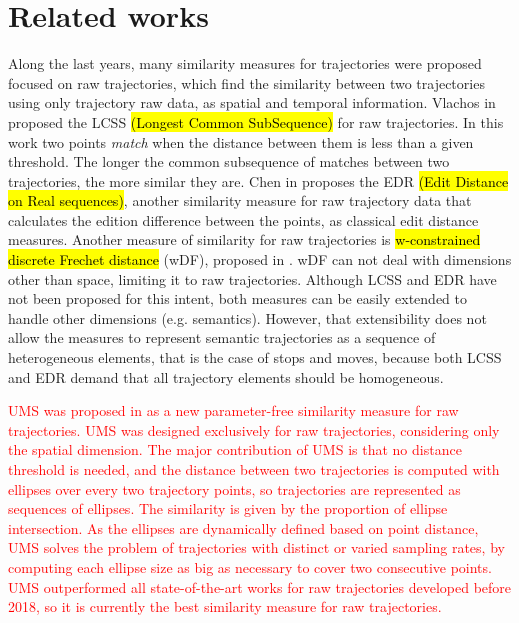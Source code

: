 \documentclass[12pt]{article}
\begin{document}
\section{Related works} \label{sec:related}
Along the last years, many similarity measures for trajectories were proposed focused on raw trajectories, which find the similarity between two trajectories using only trajectory raw data, as spatial and temporal information. Vlachos in \cite{vlachos2002discovering} proposed the LCSS \hl{(Longest Common SubSequence)} for raw trajectories. In this work two points \textit{match} when the distance between them is less than a given threshold. The longer the common subsequence of matches between two trajectories, the more similar they are. Chen in \cite{Chen:2005:RFS:1066157.1066213} proposes the EDR \hl{(Edit Distance on Real sequences)}, another similarity measure for raw trajectory data that calculates the edition difference between the points, as classical edit distance measures. Another measure of similarity for raw trajectories is \hl{w-constrained discrete Frechet distance} (wDF), proposed in \cite{Ding:2008:ESJ:1440463.1440989}. wDF can not deal with dimensions other than space, limiting it to raw trajectories. Although LCSS and EDR have not been proposed for this intent, both measures can be easily extended to handle other dimensions (e.g. semantics). However, that extensibility does not allow the measures to represent semantic trajectories as a sequence of heterogeneous elements, that is the case of stops and moves, because both LCSS and EDR demand that all trajectory elements should be homogeneous.

\textcolor{red}{UMS was proposed in \cite{Furtado-UMS-2018} as a new parameter-free similarity measure for raw trajectories. UMS was designed exclusively for raw trajectories, considering only the spatial dimension. The major contribution of UMS is that no distance threshold is needed, and the distance between two trajectories is computed with ellipses over every two trajectory points, so trajectories are represented as sequences of ellipses. The similarity is given by the proportion of ellipse intersection. As the ellipses are dynamically defined based on point distance, UMS solves the problem of trajectories with distinct or varied sampling rates, by computing each ellipse size as big as necessary to cover two consecutive points. UMS outperformed all state-of-the-art works for raw trajectories developed before 2018, so it is currently the best similarity measure for raw trajectories.}
\end{document}
